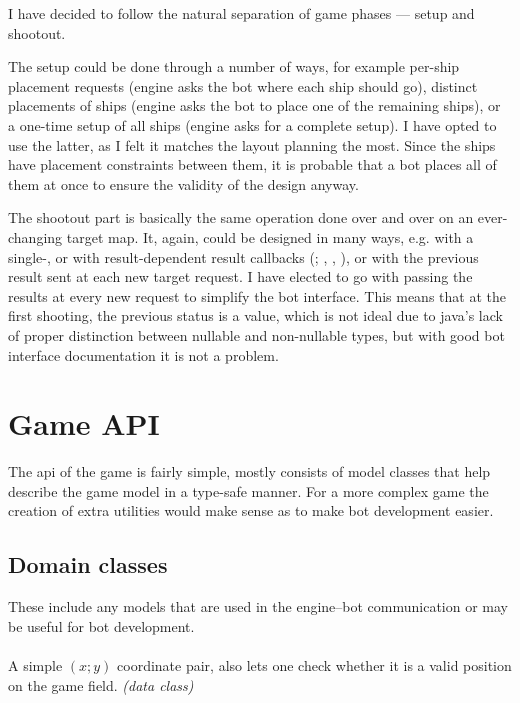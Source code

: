 		I have decided to follow the natural separation of game phases --- setup and shootout.
		
		The setup could be done through a number of ways, for example per-ship placement requests (engine asks the bot where each ship should go), distinct placements of ships (engine asks the bot to place one of the remaining ships), or a one-time setup of all ships (engine asks for a complete setup). I have opted to use the latter, as I felt it matches the layout planning the most. Since the ships have placement constraints between them, it is probable that a bot places all of them at once to ensure the validity of the design anyway.
		
		The shootout part is basically the same operation done over and over on an ever-changing target map. It, again, could be designed in many ways, e.g. with a single-, or with result-dependent result callbacks (; , , ), or with the previous result sent at each new target request. I have elected to go with passing the results at every new request to simplify the bot interface. This means that at the first shooting, the previous status is a  value, which is not ideal due to java's lack of proper distinction between nullable and non-nullable types, but with good bot interface documentation it is not a problem.

		\section{Game API}
		
		The api of the game is fairly simple, mostly consists of model classes that help describe the game model in a type-safe manner. For a more complex game the creation of extra utilities would make sense as to make bot development easier. 
		
			\subsection{Domain classes}
			
			These include any models that are used in the engine--bot communication or may be useful for bot development.
			
				\paragraph{} A simple $(x; y)$ coordinate pair, also lets one check whether it is a valid position on the game field. \emph{(data class)}
				
